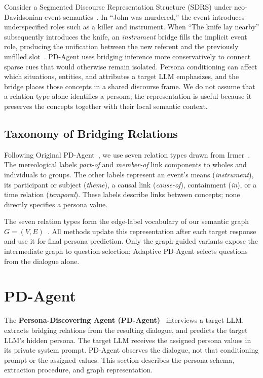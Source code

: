 \documentclass{ieeeaccess}
\begin{document}
Consider a Segmented Discourse Representation Structure (SDRS) under neo-Davidsonian event
semantics~\cite{parsons1990events,webber2016formal}. In ``John was murdered,'' the event
introduces underspecified roles such as a killer and instrument. When ``The knife lay
nearby'' subsequently introduces the knife, an \textit{instrument} bridge fills the implicit
event role, producing the unification between the new referent and the previously unfilled
slot~\cite{pustejovsky1991generative}.
PD-Agent uses bridging inference more conservatively to connect sparse cues that would
otherwise remain isolated. Persona conditioning can affect which situations,
entities, and attributes a target LLM emphasizes, and the bridge places those concepts in a
shared discourse frame. We do not assume that a relation type alone identifies a persona;
the representation is useful because it preserves the concepts together with their local
semantic context.


\subsection{Taxonomy of Bridging Relations}
Following Original PD-Agent~\cite{yang2026pragmatic}, we use seven relation types drawn
from Irmer~\cite{irmer2011bridging}. The mereological labels \textit{part-of} and
\textit{member-of} link components to wholes and individuals to groups. The other labels
represent an event's means (\textit{instrument}), its participant or subject (\textit{theme}),
a causal link (\textit{cause-of}), containment (\textit{in}), or a time relation
(\textit{temporal}). These labels describe links between concepts; none directly
specifies a persona value.

The seven relation types form the edge-label vocabulary of our semantic graph
$G=(V,E)$~\cite{hou2013global}. All methods update this
representation after each target response and use it for final persona prediction.
Only the graph-guided variants expose the intermediate graph to question selection;
Adaptive PD-Agent selects questions from the dialogue alone.

\section{PD-Agent}

The \textbf{Persona-Discovering Agent (PD-Agent)}~\cite{yang2026pragmatic} interviews a target LLM,
extracts bridging relations from the resulting dialogue, and predicts the target LLM's hidden
persona. The target LLM receives the assigned persona values in its private system prompt.
PD-Agent observes the dialogue, not that conditioning prompt or the assigned values.
This section describes the persona schema, extraction procedure, and
graph representation.
\end{document}

